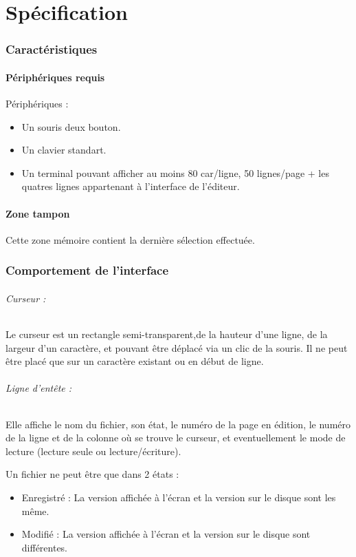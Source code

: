 \part{Spécification}

\section{Caractéristiques}
\subsection{Périphériques requis}
Périphériques :
\begin{itemize}
	\item Un souris deux bouton.
	\item Un clavier standart.
	\item Un terminal pouvant afficher au moins 80 car/ligne, 50 lignes/page + les quatres lignes appartenant à l'interface de l'éditeur.
\end{itemize}

\subsection{Zone tampon}
Cette zone mémoire contient la dernière sélection effectuée.

\section{Comportement de l'interface}

\paragraph{Curseur :} Le curseur est un rectangle semi-transparent,de la hauteur d'une ligne, de la largeur d'un caractère, et pouvant être déplacé via un clic de la souris. Il ne peut être placé que sur un caractère existant ou en début de ligne.

\paragraph{Ligne d'entête :} Elle affiche le nom du fichier, son état, le numéro de la page en édition, le numéro de la ligne et de la colonne où se trouve le curseur, et eventuellement le mode de lecture (lecture seule ou lecture/écriture).

Un fichier ne peut être que dans 2 états :
\begin{itemize}
	\item Enregistré : La version affichée à l'écran et la version sur le disque sont les même.
	\item Modifié :	La version affichée à l'écran et la version sur le disque sont différentes.
\end{itemize}

